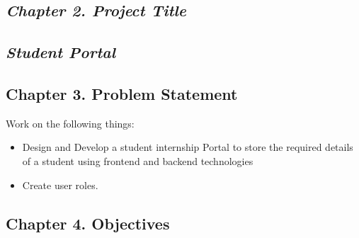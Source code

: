 \documentclass[12pt]{article}
\begin{document}
\pagebreak
\newpage
\begin{center}\section*{\Large \emph{Chapter 2. Project Title}}\end{center}
\begin{center}\subsection*{\large \emph{Student Portal }}\end{center}
\bigskip
\begin{center}\section*{\Large Chapter 3. Problem Statement}\end{center}
\vspace{1cm}
\hspace{1cm}\hspace{0.25cm}Work on the following things:\\
\vspace{1cm}
\begin{itemize}
         \item Design and Develop a student internship Portal to store the required details of a student using frontend and backend technologies 
         \item Create user roles. 
\end{itemize}
\pagebreak
\newpage
\begin{center}\section*{\Large Chapter 4. Objectives}\end{center}
\vspace{1.5cm}
\end{document}
